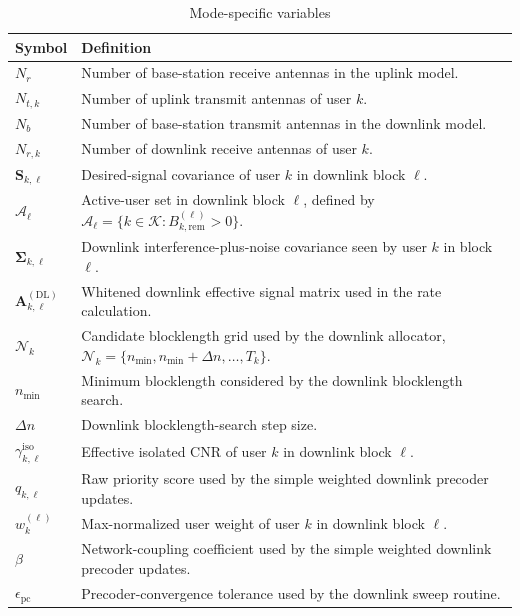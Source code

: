 \documentclass[11pt]{article}
\newcommand{\Kset}{\mathcal{K}}
\newcommand{\Aset}{\mathcal{A}}
\newcommand{\Nset}{\mathcal{N}}
\newcommand{\A}{\mathbf{A}}
\newcommand{\Sig}{\mathbf{\Sigma}}
\newcommand{\DL}{\mathrm{DL}}
\begin{document}
\begin{table}[ht]
\centering
\small
\caption{Mode-specific variables}
\label{tab:mode-notation}
\renewcommand{\arraystretch}{1.15}
\begin{tabularx}{\textwidth}{>{\raggedright\arraybackslash}p{} X}
\toprule
Symbol & Definition \\
\midrule
$N_r$ & Number of base-station receive antennas in the uplink model. \\
$N_{t,k}$ & Number of uplink transmit antennas of user $k$. \\
$N_b$ & Number of base-station transmit antennas in the downlink model. \\
$N_{r,k}$ & Number of downlink receive antennas of user $k$. \\
$\mathbf{S}_{k,\ell}$ & Desired-signal covariance of user $k$ in downlink block $\ell$. \\
$\Aset_\ell$ & Active-user set in downlink block $\ell$, defined by $\Aset_\ell = \{k \in \Kset : B_{k,\mathrm{rem}}^{(\ell)} > 0\}$. \\
$\Sig_{k,\ell}$ & Downlink interference-plus-noise covariance seen by user $k$ in block $\ell$. \\
$\A_{k,\ell}^{(\DL)}$ & Whitened downlink effective signal matrix used in the rate calculation. \\
$\Nset_k$ & Candidate blocklength grid used by the downlink allocator, $\Nset_k = \{n_{\min}, n_{\min}+\Delta n,\dots,T_k\}$. \\
$n_{\min}$ & Minimum blocklength considered by the downlink blocklength search. \\
$\Delta n$ & Downlink blocklength-search step size. \\
$\gamma_{k,\ell}^{\mathrm{iso}}$ & Effective isolated CNR of user $k$ in downlink block $\ell$. \\
$q_{k,\ell}$ & Raw priority score used by the simple weighted downlink precoder updates. \\
$w_k^{(\ell)}$ & Max-normalized user weight of user $k$ in downlink block $\ell$. \\
$\beta$ & Network-coupling coefficient used by the simple weighted downlink precoder updates. \\
$\epsilon_{\mathrm{pc}}$ & Precoder-convergence tolerance used by the downlink sweep routine. \\
\bottomrule
\end{tabularx}
\end{table}
\end{document}
